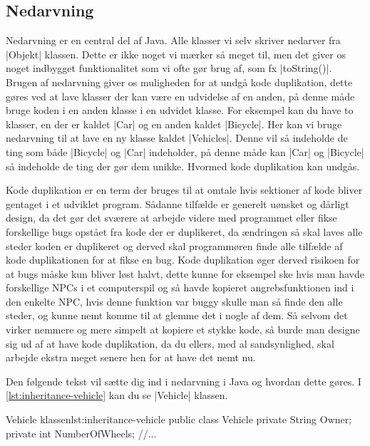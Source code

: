 \subsection{Nedarvning}

Nedarvning er en central del af Java. Alle klasser vi selv skriver nedarver fra \JavaInline|Objekt| klassen. Dette er ikke noget vi mærker så meget til, men det giver os noget indbygget funktionalitet som vi ofte gør brug af, som fx \JavaInline|toString()|. Brugen af nedarvning giver os muligheden for at undgå kode duplikation, dette gøres ved at lave klasser der kan være en udvidelse af en anden, på denne måde bruge koden i en anden klasse i en udvidet klasse. For eksempel kan du have to klasser, en der er kaldet \JavaInline|Car| og en anden kaldet \JavaInline|Bicycle|. Her kan vi bruge nedarvning til at lave en ny klasse kaldet \JavaInline|Vehicles|. Denne vil så indeholde de ting som både \JavaInline|Bicycle| og \JavaInline|Car| indeholder, på denne måde kan \JavaInline|Car| og \JavaInline|Bicycle| så indeholde de ting der gør dem unikke. Hvormed kode duplikation kan undgås.

Kode duplikation er en term der bruges til at omtale hvis sektioner af kode bliver gentaget i et udviklet program. Sådanne tilfælde er generelt uønsket og dårligt design, da det gør det sværere at arbejde videre med programmet eller fikse forskellige bugs opstået fra kode der er duplikeret, da ændringen så skal laves alle steder koden er duplikeret og derved skal programmøren finde alle tilfælde af kode duplikationen for at fikse en bug. Kode duplikation øger derved risikoen for at bugs måske kun bliver løst halvt, dette kunne for eksempel ske hvis man havde forskellige NPCs i et computerspil og så havde kopieret angrebsfunktionen ind i den enkelte NPC, hvis denne funktion var buggy skulle man så finde den alle steder, og kunne nemt komme til at glemme det i nogle af dem. Så selvom det virker nemmere og mere simpelt at kopiere et stykke kode, så burde man designe sig ud af at have kode duplikation, da du ellers, med al sandsynlighed, skal arbejde ekstra meget senere hen for at have det nemt nu.

Den følgende tekst vil sætte dig ind i nedarvning i Java og hvordan dette gøres. I \autoref{lst:inheritance-vehicle} kan du se \JavaInline|Vehicle| klassen.

\begin{JavaCode}{Vehicle klassen}{lst:inheritance-vehicle}
	public class Vehicle
	{
		private String Owner;
		private int NumberOfWheels;
		//...
	}
\end{JavaCode}
	
